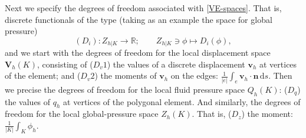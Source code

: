 \documentclass[smallextended]{svjour3}
\numberwithin{equation}{section}
\numberwithin{figure}{section}
\numberwithin{table}{section}
\newcommand\bV{\mathbf{V}}
\newcommand\bg{\boldsymbol{g}}
\newcommand\nn{{\boldsymbol{n}}}
\newcommand\bv{\boldsymbol{v}}
\newcommand\vdiv{{\mathop{\mathrm{div}}\nolimits}}
\newcommand{\ds}{\,\mathrm{d}s}
\begin{document}
	Next we specify the degrees of freedom associated with \eqref{VE-spaces}. That is, discrete functionals of the type (taking as an example the space for global pressure)
	$$(D_i): Z_{h|K} \to \mathbb{R}; \qquad  Z_{h|K} \ni \phi \mapsto D_i(\phi),$$
	and we start with the degrees of freedom for the local displacement space $\bV_h(K)$, consisting of
	($D_v1$) the values of a discrete displacement $\bv_h$ at vertices of the element;
	and ($D_v2$) the moments of $\bv_h$ on the edges: $\frac{1}{|e|} \int_e \bv_h \cdot \nn \ds.$
	Then we precise the degrees of freedom for the local fluid pressure space $Q_h(K)$:
	($D_q$) the values of $q_h$ at vertices of the polygonal element.
	And similarly, the degrees of freedom for the local global-pressure space $Z_h(K)$. That is, 
	($D_z$) the moment:
	$\frac{1}{|K|} \int_K \phi_h.$
	
\end{document}
